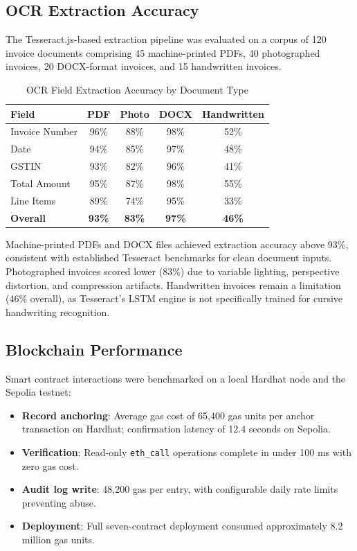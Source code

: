 \documentclass[conference]{IEEEtran}
\begin{document}
\subsection{OCR Extraction Accuracy}
The Tesseract.js-based extraction pipeline was evaluated on a corpus of 120 invoice documents comprising 45 machine-printed PDFs, 40 photographed invoices, 20 DOCX-format invoices, and 15 handwritten invoices.

\begin{table}[htbp]
\caption{OCR Field Extraction Accuracy by Document Type}
\begin{center}
\renewcommand{\arraystretch}{1.2}
\begin{tabular}{|l|c|c|c|c|}
\hline
\textbf{Field} & \textbf{PDF} & \textbf{Photo} & \textbf{DOCX} & \textbf{Handwritten} \\
\hline
Invoice Number & 96\% & 88\% & 98\% & 52\% \\
\hline
Date & 94\% & 85\% & 97\% & 48\% \\
\hline
GSTIN & 93\% & 82\% & 96\% & 41\% \\
\hline
Total Amount & 95\% & 87\% & 98\% & 55\% \\
\hline
Line Items & 89\% & 74\% & 95\% & 33\% \\
\hline
\textbf{Overall} & \textbf{93\%} & \textbf{83\%} & \textbf{97\%} & \textbf{46\%} \\
\hline
\end{tabular}
\label{tab_ocr}
\end{center}
\end{table}

Machine-printed PDFs and DOCX files achieved extraction accuracy above 93\%, consistent with established Tesseract benchmarks for clean document inputs. Photographed invoices scored lower (83\%) due to variable lighting, perspective distortion, and compression artifacts. Handwritten invoices remain a limitation (46\% overall), as Tesseract's LSTM engine is not specifically trained for cursive handwriting recognition.

\subsection{Blockchain Performance}
Smart contract interactions were benchmarked on a local Hardhat node and the Sepolia testnet:

\begin{itemize}
    \item \textbf{Record anchoring}: Average gas cost of 65,400 gas units per anchor transaction on Hardhat; confirmation latency of 12.4 seconds on Sepolia.
    \item \textbf{Verification}: Read-only \texttt{eth\_call} operations complete in under 100 ms with zero gas cost.
    \item \textbf{Audit log write}: 48,200 gas per entry, with configurable daily rate limits preventing abuse.
    \item \textbf{Deployment}: Full seven-contract deployment consumed approximately 8.2 million gas units.
\end{itemize}
\end{document}
